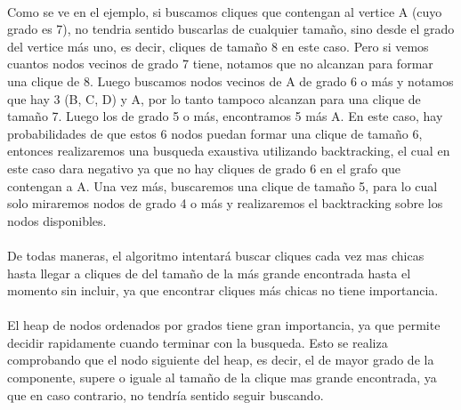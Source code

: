 \paragraph{}
Como se ve en el ejemplo, si buscamos cliques que contengan al vertice A (cuyo grado es 7), no tendria sentido buscarlas de cualquier tamaño, sino desde el grado del vertice más uno, es decir, cliques de tamaño 8 en este caso. Pero si vemos cuantos nodos vecinos de grado 7 tiene, notamos que no alcanzan para formar una clique de 8. Luego buscamos nodos vecinos de A de grado 6 o más y notamos que hay 3 (B, C, D) y A, por lo tanto tampoco alcanzan para una clique de tamaño 7. Luego los de grado 5 o más, encontramos 5 más A. En este caso, hay probabilidades de que estos 6 nodos puedan formar una clique de tamaño 6, entonces realizaremos una busqueda exaustiva utilizando backtracking, el cual en este caso dara negativo ya que no hay cliques de grado 6 en el grafo que contengan a A. Una vez más, buscaremos una clique de tamaño 5, para lo cual solo miraremos nodos de grado 4 o más y realizaremos el backtracking sobre los nodos disponibles. 

\paragraph{}
De todas maneras, el algoritmo intentará buscar cliques cada vez mas chicas hasta llegar a cliques de del tamaño de la más grande encontrada hasta el momento sin incluir, ya que encontrar cliques más chicas no tiene importancia. 


\paragraph{}
El heap de nodos ordenados por grados tiene gran importancia, ya que permite decidir rapidamente cuando terminar con la busqueda. Esto se realiza comprobando que el nodo siguiente del heap, es decir, el de mayor grado de la componente, supere o iguale al tamaño de la clique mas grande encontrada, ya que en caso contrario, no tendría sentido seguir buscando.
